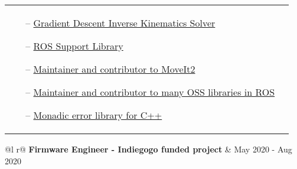 \documentclass[a4paper,12pt]{article}
\begin{document}
\begin{tabularx}{\linewidth}{ @{}l r@{} }
{\begin{minipage}[t]{\linewidth}
\begin{itemize}[nosep,after=\strut, leftmargin=1em, itemsep=3pt]
        \item[--] \href{https://github.com/pickNikRobotics/pick_ik}{Gradient Descent Inverse Kinematics Solver}
        \item[--] \href{https://github.com/picknikrobotics/RSL}{ROS Support Library}
        \item[--] \href{https://github.com/ros-planning/moveit2}{Maintainer and contributor to MoveIt2}
        \item[--] \href{http://ros.rocks/?q=Tyler+Weaver}{Maintainer and contributor to many OSS libraries in ROS}
        \item[--] \href{https://www.fplib.dev/}{Monadic error library for C++}
    \end{itemize}
    \end{minipage}}
\end{tabularx}

\begin{tabularx}{\linewidth}{ @{}l r@{} }
\textbf{Firmware Engineer - Indiegogo funded project} & \hfill May 2020 - Aug 2020 \\[3.75pt]
\end{tabularx}
\end{document}
